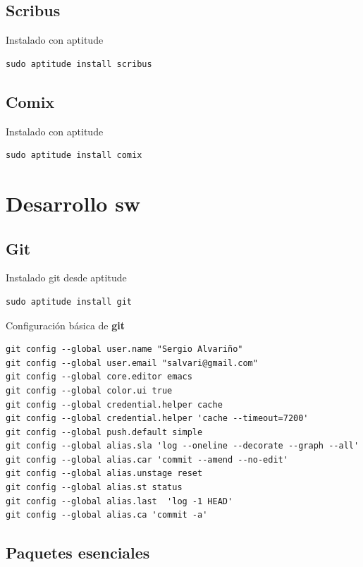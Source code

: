 \documentclass[12pt,spanish,]{article}
\begin{document}
\subsection{Scribus}\label{scribus}

Instalado con aptitude

\begin{verbatim}
sudo aptitude install scribus
\end{verbatim}

\subsection{Comix}\label{comix}

Instalado con aptitude

\begin{verbatim}
sudo aptitude install comix
\end{verbatim}

\section{Desarrollo sw}\label{desarrollo-sw}

\subsection{Git}\label{git}

Instalado git desde aptitude

\begin{verbatim}
sudo aptitude install git
\end{verbatim}

Configuración básica de \textbf{git}

\begin{verbatim}
git config --global user.name "Sergio Alvariño"
git config --global user.email "salvari@gmail.com"
git config --global core.editor emacs
git config --global color.ui true
git config --global credential.helper cache
git config --global credential.helper 'cache --timeout=7200'
git config --global push.default simple
git config --global alias.sla 'log --oneline --decorate --graph --all'
git config --global alias.car 'commit --amend --no-edit'
git config --global alias.unstage reset
git config --global alias.st status
git config --global alias.last  'log -1 HEAD'
git config --global alias.ca 'commit -a'
\end{verbatim}

\subsection{Paquetes esenciales}\label{paquetes-esenciales}
\end{document}
